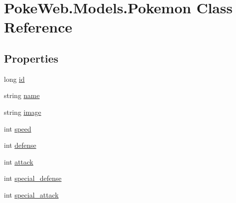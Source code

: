 \hypertarget{class_poke_web_1_1_models_1_1_pokemon}{}\section{Poke\+Web.\+Models.\+Pokemon Class Reference}
\label{class_poke_web_1_1_models_1_1_pokemon}
\subsection*{Properties}
\begin{DoxyCompactItemize}
\item 
long \mbox{\hyperlink{class_poke_web_1_1_models_1_1_pokemon_a35354c2b166053864d0faa1e3409b195}{id}}
\item 
string \mbox{\hyperlink{class_poke_web_1_1_models_1_1_pokemon_a1ecc395a836db96ccd1f3a03006d8ec0}{name}}
\item 
string \mbox{\hyperlink{class_poke_web_1_1_models_1_1_pokemon_a057ea49079a54039e937909cd988ca6b}{image}}
\item 
int \mbox{\hyperlink{class_poke_web_1_1_models_1_1_pokemon_a2ae5e08e7eb16ffb86763a91e106afe4}{speed}}
\item 
int \mbox{\hyperlink{class_poke_web_1_1_models_1_1_pokemon_aad557ec06fa783140a59b9aab7cf85a6}{defense}}
\item 
int \mbox{\hyperlink{class_poke_web_1_1_models_1_1_pokemon_a48b57f219aaf1a924b1ecb0a64ab2f3f}{attack}}
\item 
int \mbox{\hyperlink{class_poke_web_1_1_models_1_1_pokemon_aa0cb2ccf7bc83dd3bf65f54d7d9c760e}{special\+\_\+defense}}
\item 
int \mbox{\hyperlink{class_poke_web_1_1_models_1_1_pokemon_a963dba983b3db5098c52716042d82ff8}{special\+\_\+attack}}
\item 

\end{DoxyCompactItemize}
